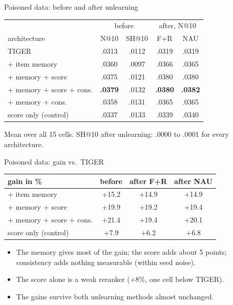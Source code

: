 \documentclass{beamer}
\newcommand{\up}[1]{\textcolor{green!45!black}{#1}}
\begin{document}
\begin{frame}{Poisoned data: before and after unlearning}
\centering
\small
\begin{tabular}{lcccc}
\toprule
                         & \multicolumn{2}{c}{before} & \multicolumn{2}{c}{after, N@10} \\
architecture             & N@10 & SH@10 & F+R & NAU \\
\midrule
TIGER                    & .0313 & .0112 & .0319 & .0319 \\
+ item memory            & .0360 & .0097 & .0366 & .0365 \\
+ memory + score         & .0375 & .0121 & .0380 & .0380 \\
+ memory + score + cons. & \textbf{.0379} & .0132 & \textbf{.0380} & \textbf{.0382} \\
\midrule
+ memory + cons.         & .0358 & .0131 & .0365 & .0365 \\
score only (control)     & .0337 & .0133 & .0339 & .0340 \\
\bottomrule
\end{tabular}

\bigskip
\footnotesize Mean over all 15 cells. SH@10 after unlearning: .0000 to .0001
for every architecture.
\end{frame}

\begin{frame}{Poisoned data: gain vs.\ TIGER}
\centering
\begin{tabular}{lccc}
\toprule
gain in \%               & before & after F+R & after NAU \\
\midrule
+ item memory          & \up{+15.2} & \up{+14.9} & \up{+14.9} \\
+ memory + score         & \up{+19.9} & \up{+19.2} & \up{+19.4} \\
+ memory + score + cons. & \up{+21.4} & \up{+19.4} & \up{+20.1} \\
score only (control)     & \up{+7.9}  & \up{+6.2}  & \up{+6.8} \\
\bottomrule
\end{tabular}

\medskip
\begin{itemize}\small
  \item The memory gives most of the gain; the score adds about 5 points;
        consistency adds nothing measurable (within seed noise).
  \item The score alone is a weak reranker (+8\%, one cell below TIGER).
  \item The gains survive both unlearning methods almost unchanged.
\end{itemize}
\end{frame}
\end{document}

